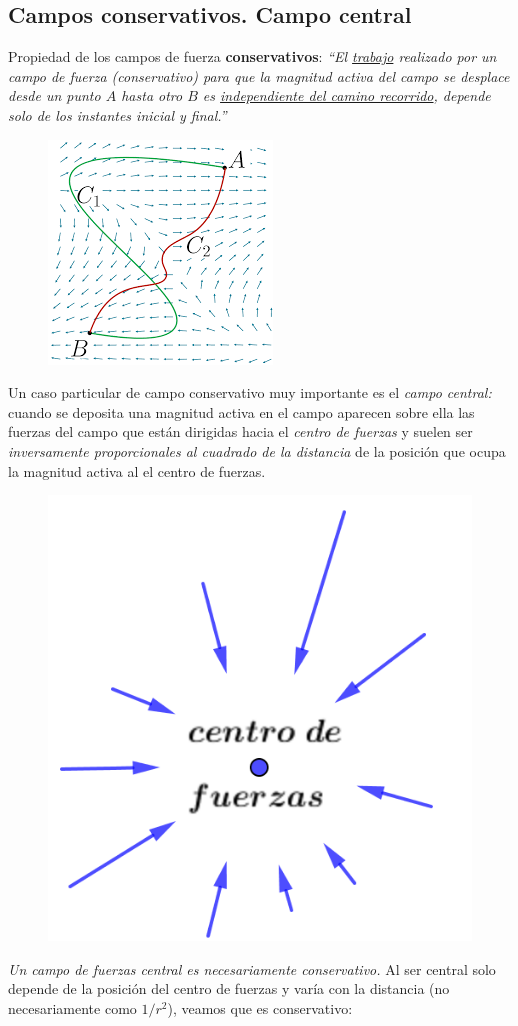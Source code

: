 \subsection{Campos conservativos. Campo central}

\begin{multicols}{2}
Propiedad de los campos de fuerza \textbf{conservativos}: \emph{``El \underline{trabajo} realizado por un campo de fuerza (conservativo) para que la magnitud activa del campo se desplace desde un punto $A$ hasta otro $B$ es \underline{independiente del camino recorrido}, depende solo de los instantes inicial y final.''}
\begin{figure}[H]
		\centering
		\includegraphics[width=.2\textwidth]{imagenes/imagenes03/T03IM09.png}
		\end{figure}
\end{multicols}

\begin{multicols}{2}
Un caso particular de campo conservativo muy importante es el \emph{campo central:} cuando se deposita una magnitud activa en el campo aparecen sobre ella las fuerzas del campo que están dirigidas hacia el \emph{centro de fuerzas} y suelen ser \emph{inversamente proporcionales al cuadrado de la distancia} de la posición que ocupa la magnitud activa al el centro de fuerzas.
\begin{figure}[H]
		\centering
		\includegraphics[width=.25\textwidth]{imagenes/imagenes03/T03IM10.png}
		\end{figure}
\end{multicols}

\emph{Un campo de fuerzas central es necesariamente conservativo.} Al ser central solo depende de la posición del centro de fuerzas y varía con la distancia (no necesariamente como $1/r^2$), veamos que es conservativo:

